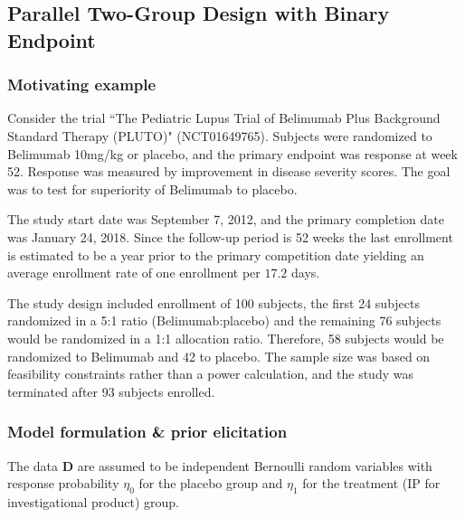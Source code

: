 \documentclass[12pt]{article}
\begin{document}

\subsection{Parallel Two-Group Design with Binary Endpoint}\label{sec:example2}
\subsubsection{Motivating example}
Consider the trial ``The Pediatric Lupus Trial of Belimumab Plus Background Standard Therapy (PLUTO)" (NCT01649765). Subjects were randomized to Belimumab 10mg/kg or placebo, and the primary endpoint was response at week 52. Response was measured by improvement in disease severity scores. The goal was to test for superiority of Belimumab to placebo. 

The study start date was September 7, 2012, and the primary completion date was January 24, 2018. Since the follow-up period is 52 weeks the last enrollment is estimated to be a year prior to the primary competition date yielding an average enrollment rate of one enrollment per $17.2$ days.

The study design included enrollment of 100 subjects, the first 24 subjects randomized in a 5:1 ratio (Belimumab:placebo) and the remaining 76 subjects would be randomized in a 1:1 allocation ratio. Therefore, 58 subjects would be randomized to Belimumab and 42 to placebo. The sample size was based on feasibility constraints rather than a power calculation, and the study was terminated after 93 subjects enrolled.

\subsubsection{Model formulation \& prior elicitation}\label{sec:example2model}
The data $\mathbf{D}$ are assumed to be independent Bernoulli random variables with response probability $\eta_0$ for the placebo group and $\eta_1$ for the treatment (IP for investigational product) group. 
\end{document}

